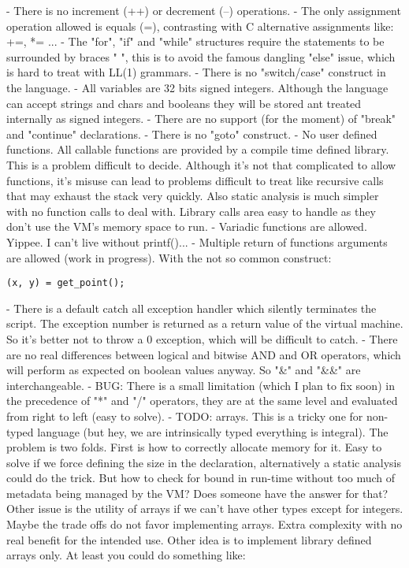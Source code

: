 \documentclass[11pt]{article} %
\begin{document}
- There is no increment (++) or decrement (--) operations.
- The only assignment operation allowed is equals (=), contrasting with C alternative assignments like:  +=, *= ...
- The "for", "if" and "while" structures require the statements to be surrounded by braces "{ }", this is to avoid the famous dangling "else" issue, which is hard to treat with LL(1) grammars.
- There is no "switch/case" construct in the language.
- All variables are 32 bits signed integers. Although the language can accept strings and chars and booleans they will be stored ant treated internally as signed integers.
- There are no support (for the moment) of "break" and "continue" declarations.
- There is no "goto" construct.
- No user defined functions. All callable functions are provided by a compile time defined library. This is a problem difficult to decide. Although it's not that complicated to allow functions, it's misuse can lead to problems difficult to treat like recursive calls that may exhaust the stack very quickly. Also static analysis is much simpler with no function calls to deal with. Library calls area easy to handle as they don't use the VM's memory space to run.
- Variadic functions are allowed. Yippee. I can't live without printf()...
- Multiple return of functions arguments are allowed (work in progress). With the not so common construct:

\begin{lstlisting}[caption={Multivalued return},label={lst:verilog-if},language=C99,frame=single]
     (x, y) = get_point();
\end{lstlisting}

- There is a default catch all exception handler which silently terminates the script. The exception number is returned as a return value of the virtual machine. So it's better not to throw a 0 exception, which will be difficult to catch.
- There are no real differences between logical and bitwise AND and OR operators, which will perform as expected on boolean values anyway. So "\&" and "\&\&" are interchangeable.
- BUG: There is a small limitation (which I plan to fix soon) in the precedence of "*" and "/" operators, they are at the same level and evaluated from right to left (easy to solve).
- TODO: arrays. This is a tricky one for non-typed language (but hey, we are intrinsically typed everything is integral). The problem is two folds. First is how to correctly allocate memory for it. Easy to solve if we force defining the size in the declaration, alternatively a static analysis could do the trick. But how to check for bound in run-time without too much of metadata being managed by the VM? Does someone have the answer for that? Other issue is the utility of arrays if we can't have other types except for integers. Maybe the trade offs do not favor implementing arrays. Extra complexity with no real benefit for the intended use. Other idea is to implement library defined arrays only. At least you could do something like:
\end{document}
